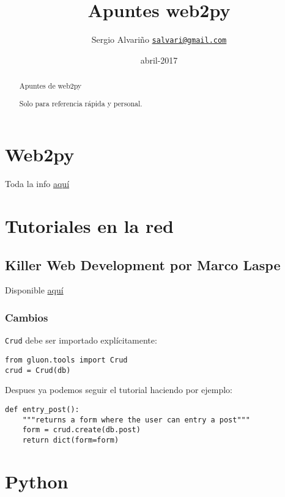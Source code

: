 \documentclass[12pt,spanish,]{article}
\title{Apuntes web2py}
\author{Sergio Alvariño
\href{mailto:salvari@gmail.com}{\nolinkurl{salvari@gmail.com}}}
\date{abril-2017}
\begin{document}
\maketitle
\begin{abstract}
Apuntes de web2py

Solo para referencia rápida y personal.
\end{abstract}

{
\hypersetup{linkcolor=black}
\setcounter{tocdepth}{3}
\tableofcontents
}
\section{Web2py}\label{web2py}

Toda la info \href{http://web2py.com}{aquí}

\section{Tutoriales en la red}\label{tutoriales-en-la-red}

\subsection{Killer Web Development por Marco
Laspe}\label{killer-web-development-por-marco-laspe}

Disponible \href{http://killer-web-development.com}{aquí}

\subsubsection{Cambios}\label{cambios}

\texttt{Crud} debe ser importado explícitamente:

\begin{verbatim}
from gluon.tools import Crud
crud = Crud(db)
\end{verbatim}

Despues ya podemos seguir el tutorial haciendo por ejemplo:

\begin{verbatim}
def entry_post():
    """returns a form where the user can entry a post"""
    form = crud.create(db.post)
    return dict(form=form)
\end{verbatim}

\section{Python}\label{python}
\end{document}
